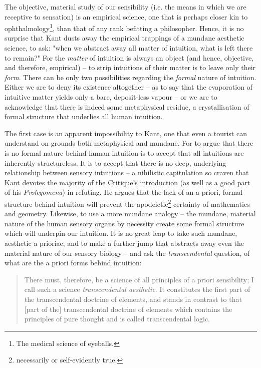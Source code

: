 \noindent
The objective, material study of our sensibility (i.e. the means in which we are receptive to sensation) is an empirical science, one that is perhaps closer kin to ophthalmology\footnote{The medical science of eyeballs.}, than that of any rank befitting a philosopher. Hence, it is no surprise that Kant dusts away the empirical trappings of a mundane aesthetic science, to ask: "when we abstract away all matter of intuition, what is left there to remain?" For the \emph{matter} of intuition is always an object (and hence, objective, and therefore, empirical) -- to strip intuitions of their matter is to leave only their \emph{form}. There can be only two possibilities regarding the \emph{formal} nature of intuition. Either we are to deny its existence altogether -- as to say that the evaporation of intuitive matter yields only a bare, deposit-less vapour -- or we are to acknowledge that there is indeed some metaphysical residue, a crystallisation of formal structure that underlies all human intuition.

The first case is an apparent impossibility to Kant, one that even a tourist can understand on grounds both metaphysical and mundane. For to argue that there is no formal nature behind human intuition is to accept that all intuitions are inherently structureless. It is to accept that there is no deep, underlying relationship between sensory intuitions -- a nihilistic capitulation so craven that Kant devotes the majority of the Critique's introduction (as well as a good part of his \emph{Prolegomena}) in refuting. He argues that the lack of an a priori, formal structure behind intuition will prevent the apodeictic\footnote{necessarily or self-evidently true.} certainty of mathematics and geometry. Likewise, to use a more mundane analogy -- the mundane, material nature of the human sensory organs by necessity create some formal structure which will underpin our intuition. It is no great leap to take such mundane, aesthetic a prioriae, and to make a further jump that abstracts away even the material nature of our sensory biology -- and ask the \emph{transcendental} question, of what are the a priori forms behind intuition:

\begin{quote}
  There must, therefore, be a science of all principles of a priori sensibility; I call such a science \emph{transcendental aesthetic}. It constitutes the first part of the transcendental doctrine of elements, and stands in contrast to that [part of the] transcendental doctrine of elements which contains the principles of pure thought and is called transcendental logic.

  \autocite[B36]{hackett}
\end{quote}

